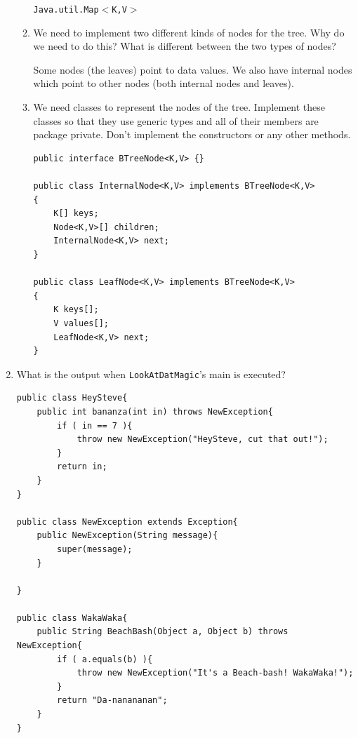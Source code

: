 \documentclass[11pt]{article}
\newenvironment{answer}{\large\lstset{basicstyle=\tiny\ttfamily}\color{white}}{}
\newenvironment{answer}{\large\lstset{basicstyle=\large\ttfamily}\color{red}}{}
\begin{document}
\begin{enumerate}
\begin{enumerate}
        \begin{answer}
        \texttt{Java.util.Map$<$K,V$>$}
        \end{answer}
		\vspace{0.125in}

    \item We need to implement two different kinds of nodes for the tree. Why
    do we need to do this? What is different between the two types of nodes?

        \begin{answer}
        Some nodes (the leaves) point to data values. We also have internal
        nodes which point to other nodes (both internal nodes and leaves).
        \end{answer}
		\vspace{0.125in}

    \item We need classes to represent the nodes of the tree. Implement these
    classes so that they use generic types and all of their members are package
    private. Don't implement the constructors or any other methods.

\begin{answer}
\begin{lstlisting}
public interface BTreeNode<K,V> {}

public class InternalNode<K,V> implements BTreeNode<K,V>
{
    K[] keys;
    Node<K,V>[] children;
    InternalNode<K,V> next;
}

public class LeafNode<K,V> implements BTreeNode<K,V>
{
    K keys[];
    V values[];
    LeafNode<K,V> next;
}
\end{lstlisting}
\end{answer}

    \end{enumerate}


\newpage
\item What is the output when \texttt{LookAtDatMagic}'s main is executed?
\begin{lstlisting}
public class HeySteve{
    public int bananza(int in) throws NewException{
        if ( in == 7 ){
            throw new NewException("HeySteve, cut that out!");
        }
        return in;
    }
}

public class NewException extends Exception{
    public NewException(String message){
        super(message);
    }

}
           
public class WakaWaka{
    public String BeachBash(Object a, Object b) throws NewException{
        if ( a.equals(b) ){
            throw new NewException("It's a Beach-bash! WakaWaka!");
        }
        return "Da-nanananan";
    }
}


\end{lstlisting}
\end{enumerate}
\end{document}
